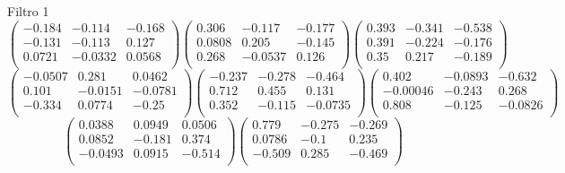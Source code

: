 Filtro 1
{ \small
\[
\begin{pmatrix}
  -0.184 & -0.114 & -0.168 \\
  -0.131 & -0.113 & 0.127 \\
  0.0721 & -0.0332 & 0.0568 \\
\end{pmatrix}
\begin{pmatrix}
  0.306 & -0.117 & -0.177 \\
  0.0808 & 0.205 & -0.145 \\
  0.268 & -0.0537 & 0.126 \\
\end{pmatrix}
\begin{pmatrix}
  0.393 & -0.341 & -0.538 \\
  0.391 & -0.224 & -0.176 \\
  0.35 & 0.217 & -0.189 \\
\end{pmatrix}
\]
\[
\begin{pmatrix}
  -0.0507 & 0.281 & 0.0462 \\
  0.101 & -0.0151 & -0.0781 \\
  -0.334 & 0.0774 & -0.25 \\
\end{pmatrix}
\begin{pmatrix}
  -0.237 & -0.278 & -0.464 \\
  0.712 & 0.455 & 0.131 \\
  0.352 & -0.115 & -0.0735 \\
\end{pmatrix}
\begin{pmatrix}
  0.402 & -0.0893 & -0.632 \\
  -0.00046 & -0.243 & 0.268 \\
  0.808 & -0.125 & -0.0826 \\
\end{pmatrix}
\]
\[
\begin{pmatrix}
  0.0388 & 0.0949 & 0.0506 \\
  0.0852 & -0.181 & 0.374 \\
  -0.0493 & 0.0915 & -0.514 \\
\end{pmatrix}
\begin{pmatrix}
  0.779 & -0.275 & -0.269 \\
  0.0786 & -0.1 & 0.235 \\
  -0.509 & 0.285 & -0.469 \\
\end{pmatrix}
\]
}

